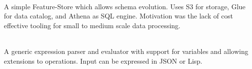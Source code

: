 \documentclass[]{deedy-resume-openfont}
\begin{document}
\hfill {}\\
A simple Feature-Store which allows schema evolution. Uses S3 for storage, Glue for data catalog, and Athena as SQL engine. Motivation was the lack of cost effective tooling for small to medium scale data processing.\\
\sectionsep
  

\hfill {}\\
A generic expression parser and evaluator with support for variables and allowing extensions to operations. Input can be expressed in JSON or Lisp. %
\ 
\end{document}
